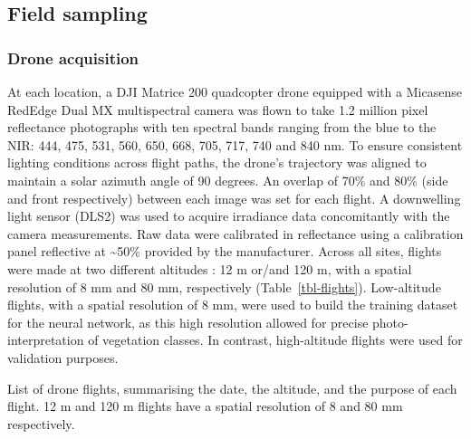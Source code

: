 \documentclass[
  letterpaper,
  11pt,
  english,
  singlespacing,
  headsepline]{MastersDoctoralThesis}
\begin{document}
\begin{spacing}{1.5}
\subsection{Field sampling}\label{field-sampling}

\subsubsection{Drone acquisition}\label{drone-acquisition}

At each location, a DJI Matrice 200 quadcopter drone equipped with a
Micasense RedEdge Dual MX multispectral camera was flown to take 1.2
million pixel reflectance photographs with ten spectral bands ranging
from the blue to the NIR: 444, 475, 531, 560, 650, 668, 705, 717, 740
and 840 nm. To ensure consistent lighting conditions across flight
paths, the drone's trajectory was aligned to maintain a solar azimuth
angle of 90 degrees. An overlap of 70\% and 80\% (side and front
respectively) between each image was set for each flight. A downwelling
light sensor (DLS2) was used to acquire irradiance data concomitantly
with the camera measurements. Raw data were calibrated in reflectance
using a calibration panel reflective at \textasciitilde50\% provided by
the manufacturer. Across all sites, flights were made at two different
altitudes : 12 m or/and 120 m, with a spatial resolution of 8 mm and 80
mm, respectively (Table~\ref{tbl-flights}). Low-altitude flights, with a
spatial resolution of 8 mm, were used to build the training dataset for
the neural network, as this high resolution allowed for precise
photo-interpretation of vegetation classes. In contrast, high-altitude
flights were used for validation purposes.

\begin{table}

\caption{\label{tbl-flights}List of drone flights, summarising the date,
the altitude, and the purpose of each flight. 12 m and 120 m flights
have a spatial resolution of 8 and 80 mm respectively.}

\end{table}
\end{spacing}
\end{document}
